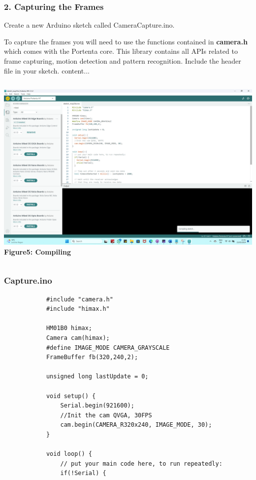 \documentclass[10pt, a4paper]{beamer}
\begin{document}
	\begin{frame}
		\frametitle{2. Capturing the Frames}
					
				\begin{block}{}
					Create a new Arduino sketch called CameraCapture.ino.\newline
					
					To capture the frames you will need to use the functions contained in \textbf{camera.h} which comes with the Portenta core. This library contains all APIs related to frame capturing, motion detection and pattern recognition. Include the header file in your sketch.
					content...
					
						\begin{columns}
							\centering
							\includegraphics[width=\textwidth]{images/Testing Code.png}
							\vspace{0.2cm}
							\textbf{Figure5: Compiling}
						\end{columns}
				\end{block}
			
	\end{frame}
	
	\begin{frame}[fragile]
		\frametitle{Capture.ino}
		\begin{lstlisting}
			#include "camera.h"
			#include "himax.h"
			
			HM01B0 himax;
			Camera cam(himax);
			#define IMAGE_MODE CAMERA_GRAYSCALE
			FrameBuffer fb(320,240,2);
			
			unsigned long lastUpdate = 0;
			
			void setup() {
				Serial.begin(921600);
				//Init the cam QVGA, 30FPS
				cam.begin(CAMERA_R320x240, IMAGE_MODE, 30);
			}
			
			void loop() {
				// put your main code here, to run repeatedly:
				if(!Serial) {    
					
		\end{lstlisting}
	\end{frame}
		
\end{document}
